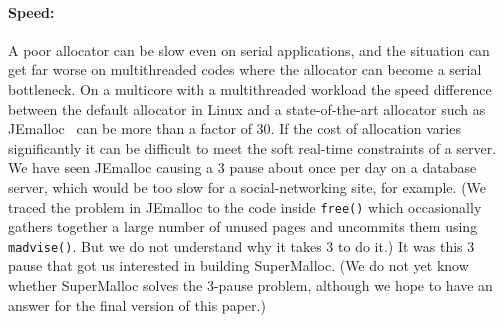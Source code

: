 \documentclass{sigplanconf}
\newcommand{\code}[1]{\texttt{#1}}
\begin{document}
{\paragraph{Speed:}} A poor allocator can be slow even on serial
applications, and the situation can get far worse on multithreaded
codes where the allocator can become a serial bottleneck.  On a
multicore with a multithreaded workload the speed difference between
the default allocator in Linux \cite{Lea96} and a state-of-the-art
allocator such as JEmalloc~\cite{Evans06} can be more than a factor of
30.  If the cost of allocation varies significantly it can be
difficult to meet the soft real-time constraints of a server.  We have
seen JEmalloc causing a \unit{3}\second{} pause about once per day on
a database server, which would be too slow for a social-networking
site, for example. (We traced the problem in JEmalloc to the code
inside \code{free()} which occasionally gathers together a large
number of unused pages and uncommits them using \code{madvise()}.  But
we do not understand why it takes \unit{3}\second{} to do it.)  It was
this \unit{3}\second{} pause that got us interested in building
SuperMalloc.  (We do not yet know whether SuperMalloc solves the
\unit{3}\second{}-pause problem, although we hope to have an answer
for the final version of this paper.)
\end{document}
